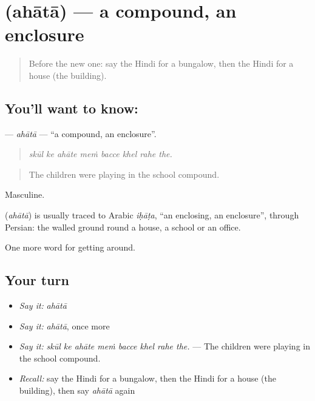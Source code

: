 \section[\texorpdfstring{\hi{अहाता} (ahātā)}{अहाता (ahātā)}]{ (ahātā) — a compound, an enclosure}

\label{lesson:HI-C422-ahata}



\begin{quote}
Before the new one: say the Hindi for a bungalow, then the Hindi for a house (the building).
\end{quote}

\subsection*{You'll want to know: }
\textbf{} — \emph{ahātā} — \textquotedblleft{}a compound, an enclosure\textquotedblright{}.

\begin{quote}
       
\end{quote}

\begin{quote}
\emph{skūl ke ahāte meṁ bacce khel rahe the.}
\end{quote}

\begin{quote}
The children were playing in the school compound.
\end{quote}

Masculine.

\begin{cousinweb}
\textbf{} (\emph{ahātā}) is usually traced to Arabic \emph{iḥāṭa}, \textquotedblleft{}an enclosing, an enclosure\textquotedblright{}, through Persian: the walled ground round a house, a school or an office.
\end{cousinweb}

\begin{grammarlens}[title={What you've built}]
One more word for getting around.
\end{grammarlens}

\subsection*{Your turn}
\begin{itemize}
\raggedright
  \item \emph{Say it:} \emph{ahātā}
  \item \emph{Say it:} \emph{ahātā}, once more
  \item \emph{Say it:} \emph{skūl ke ahāte meṁ bacce khel rahe the.} — The children were playing in the school compound.
  \item \emph{Recall:} say the Hindi for a bungalow, then the Hindi for a house (the building), then say \emph{ahātā} again
\end{itemize}

